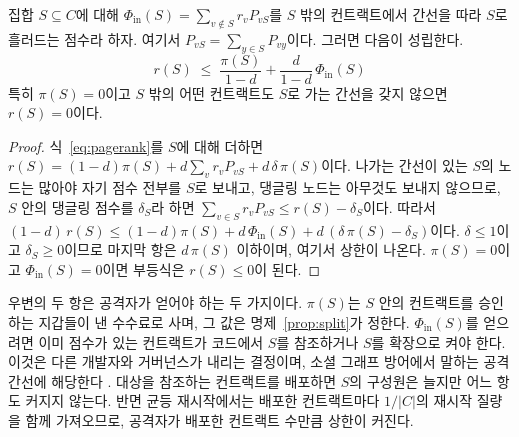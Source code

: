 \begin{proposition}
\label{prop:region}
집합 $S\subseteq C$에 대해 $\Phi_{\mathrm{in}}(S)=\sum_{v\notin S}r_v P_{vS}$를 $S$ 밖의 컨트랙트에서 간선을 따라 $S$로 흘러드는 점수라 하자. 여기서 $P_{vS}=\sum_{y\in S}P_{vy}$이다. 그러면 다음이 성립한다.
\begin{equation}
r(S)\;\leq\;\frac{\pi(S)}{1-d}+\frac{d}{1-d}\,\Phi_{\mathrm{in}}(S)
\end{equation}
특히 $\pi(S)=0$이고 $S$ 밖의 어떤 컨트랙트도 $S$로 가는 간선을 갖지 않으면 $r(S)=0$이다.
\end{proposition}

\begin{proof}
식~\eqref{eq:pagerank}를 $S$에 대해 더하면 $r(S)=(1-d)\pi(S)+d\sum_{v}r_vP_{vS}+d\,\delta\,\pi(S)$이다. 나가는 간선이 있는 $S$의 노드는 많아야 자기 점수 전부를 $S$로 보내고, 댕글링 노드는 아무것도 보내지 않으므로, $S$ 안의 댕글링 점수를 $\delta_S$라 하면 $\sum_{v\in S}r_vP_{vS}\leq r(S)-\delta_S$이다. 따라서 $(1-d)\,r(S)\leq(1-d)\pi(S)+d\,\Phi_{\mathrm{in}}(S)+d\,(\delta\,\pi(S)-\delta_S)$이다. $\delta\leq1$이고 $\delta_S\geq0$이므로 마지막 항은 $d\,\pi(S)$ 이하이며, 여기서 상한이 나온다. $\pi(S)=0$이고 $\Phi_{\mathrm{in}}(S)=0$이면 부등식은 $r(S)\leq 0$이 된다.
\end{proof}

우변의 두 항은 공격자가 얻어야 하는 두 가지이다. $\pi(S)$는 $S$ 안의 컨트랙트를 승인하는 지갑들이 낸 수수료로 사며, 그 값은 명제~\ref{prop:split}가 정한다. $\Phi_{\mathrm{in}}(S)$를 얻으려면 이미 점수가 있는 컨트랙트가 코드에서 $S$를 참조하거나 $S$를 확장으로 켜야 한다. 이것은 다른 개발자와 거버넌스가 내리는 결정이며, 소셜 그래프 방어에서 말하는 공격 간선에 해당한다 \cite{yu2006sybilguard,cao2012sybilrank}. 대상을 참조하는 컨트랙트를 배포하면 $S$의 구성원은 늘지만 어느 항도 커지지 않는다. 반면 균등 재시작에서는 배포한 컨트랙트마다 $1/|C|$의 재시작 질량을 함께 가져오므로, 공격자가 배포한 컨트랙트 수만큼 상한이 커진다.

